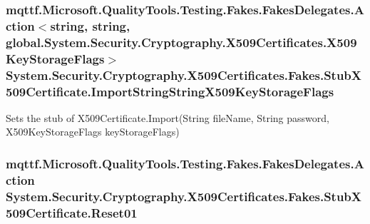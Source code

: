 \hypertarget{class_system_1_1_security_1_1_cryptography_1_1_x509_certificates_1_1_fakes_1_1_stub_x509_certificate_a76451a4f7da5fd6a9dd9836136ab60f6}{
\subsubsection[{Import\-String\-String\-X509\-Key\-Storage\-Flags}]{\setlength{\rightskip}{0pt plus 5cm}mqttf.\-Microsoft.\-Quality\-Tools.\-Testing.\-Fakes.\-Fakes\-Delegates.\-Action$<$string, string, global.\-System.\-Security.\-Cryptography.\-X509\-Certificates.\-X509\-Key\-Storage\-Flags$>$ System.\-Security.\-Cryptography.\-X509\-Certificates.\-Fakes.\-Stub\-X509\-Certificate.\-Import\-String\-String\-X509\-Key\-Storage\-Flags}}\label{class_system_1_1_security_1_1_cryptography_1_1_x509_certificates_1_1_fakes_1_1_stub_x509_certificate_a76451a4f7da5fd6a9dd9836136ab60f6}


Sets the stub of X509\-Certificate.\-Import(\-String file\-Name, String password, X509\-Key\-Storage\-Flags key\-Storage\-Flags)

\hypertarget{class_system_1_1_security_1_1_cryptography_1_1_x509_certificates_1_1_fakes_1_1_stub_x509_certificate_a634e4527d4b78c3080242fed1ab3a9e3}{
\subsubsection[{Reset01}]{\setlength{\rightskip}{0pt plus 5cm}mqttf.\-Microsoft.\-Quality\-Tools.\-Testing.\-Fakes.\-Fakes\-Delegates.\-Action System.\-Security.\-Cryptography.\-X509\-Certificates.\-Fakes.\-Stub\-X509\-Certificate.\-Reset01}}\label{class_system_1_1_security_1_1_cryptography_1_1_x509_certificates_1_1_fakes_1_1_stub_x509_certificate_a634e4527d4b78c3080242fed1ab3a9e3}


